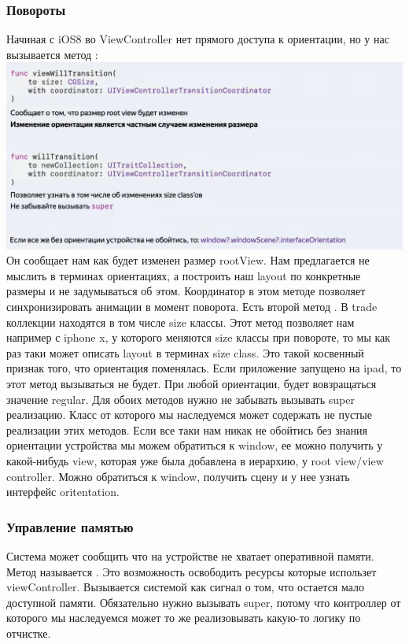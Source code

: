 \documentclass{article}
\begin{document}
    \subsubsection{Повороты}
    Начиная с iOS8 во ViewController нет прямого доступа к ориентации, но у нас вызывается метод :
    \newline
    \includegraphics[scale = 0.5]{pic/Снимок экрана 2023-08-03 в 10.21.16.png}
    \newline
    Он сообщает нам как будет изменен размер rootView. Нам предлагается не мыслить в терминах ориентациях, а построить наш layout по конкретные размеры и не задумываться об этом. Координатор в этом методе позволяет синхронизировать анимации в момент поворота. 
    \newline
    Есть второй метод . В trade коллекции находятся в том числе size классы. Этот метод позволяет нам например с iphone x, у которого меняются size классы при повороте, то мы как раз таки может описать layout в терминах size class. Это такой косвенный признак того, что ориентация поменялась. 
    \newline
    Если приложение запущено на ipad, то этот метод вызываться не будет. При любой ориентации, будет вовзращаться значение regular.
    \newline
    Для обоих методов нужно не забывать вызывать super реализацию. Класс от которого мы наследуемся может содержать не пустые реализации этих методов.
    \newline
    Если все таки нам никак не обойтись без знания ориентации устройства мы можем обратиться к window, ее можно получить у какой-нибудь view, которая уже была добавлена в иерархию, у root view/view controller. Можно обратиться к window, получить сцену и у нее узнать интерфейс oritentation.
    \newline
    \newline
    \subsubsection{Управление памятью}
    Система может сообщить что на устройстве не хватает оперативной памяти. Метод называется 
    . Это возможность освободить ресурсы которые использет viewController. Вызывается системой как сигнал о том, что остается мало доступной памяти. Обязательно нужно вызывать super, потому что контроллер от которого мы наследуемся может то же реализовывать какую-то логику по отчистке. 
\end{document}

